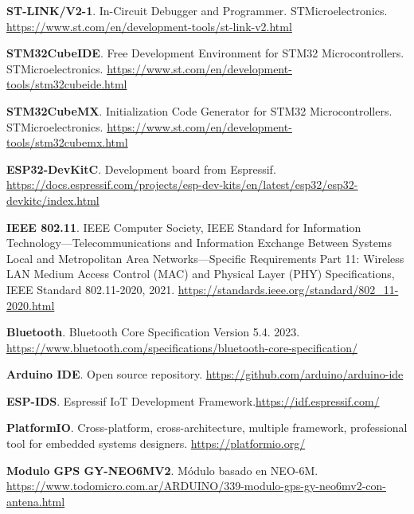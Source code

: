 \begin{thebibliography}{30}
\textbf{ST-LINK/V2-1}. In-Circuit Debugger and Programmer. STMicroelectronics.
\href{https://www.st.com/en/development-tools/st-link-v2.html}{https://www.st.com/en/development-tools/st-link-v2.html}

\textbf{STM32CubeIDE}. Free Development Environment for STM32 Microcontrollers. STMicroelectronics.
\href{https://www.st.com/en/development-tools/stm32cubeide.html}{https://www.st.com/en/development-tools/stm32cubeide.html}

\textbf{STM32CubeMX}. Initialization Code Generator for STM32 Microcontrollers. STMicroelectronics.
\href{https://www.st.com/en/development-tools/stm32cubemx.html}{https://www.st.com/en/development-tools/stm32cubemx.html}

\textbf{ESP32-DevKitC}. Development board from Espressif.  \href{https://docs.espressif.com/projects/esp-dev-kits/en/latest/esp32/esp32-devkitc/index.html}{https://docs.espressif.com/projects/esp-dev-kits/en/latest/esp32/esp32-devkitc/index.html} 

\textbf{IEEE 802.11}. IEEE Computer Society, IEEE Standard for Information Technology—Telecommunications and Information Exchange Between Systems Local and Metropolitan Area Networks—Specific Requirements Part 11: Wireless LAN Medium Access Control (MAC) and Physical Layer (PHY) Specifications, IEEE Standard 802.11-2020, 2021. \href{https://standards.ieee.org/standard/802_11-2020.html}{https://standards.ieee.org/standard/802\_11-2020.html}


\textbf{Bluetooth}. Bluetooth Core Specification Version 5.4. 2023. \href{https://www.bluetooth.com/specifications/bluetooth-core-specification/}{https://www.bluetooth.com/specifications/bluetooth-core-specification/}

\textbf{Arduino IDE}. Open source repository.  \href{https://github.com/arduino/arduino-ide}{https://github.com/arduino/arduino-ide}


\textbf{ESP-IDS}. Espressif IoT Development Framework.\href{https://idf.espressif.com/}{https://idf.espressif.com/}

\textbf{PlatformIO}. Cross-platform, cross-architecture, multiple framework, professional tool for embedded systems designers. \href{https://platformio.org/}{https://platformio.org/}


\textbf{Modulo GPS GY-NEO6MV2}. Módulo basado en NEO-6M. \href{https://www.todomicro.com.ar/ARDUINO/339-modulo-gps-gy-neo6mv2-con-antena.html}{https://www.todomicro.com.ar/ARDUINO/339-modulo-gps-gy-neo6mv2-con-antena.html}



\end{thebibliography}
